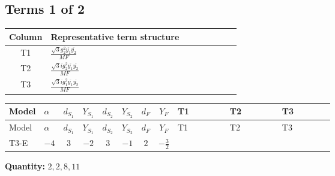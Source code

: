 \documentclass[8pt]{article}
\begin{document}
\begin{landscape}
\subsection*{Terms 1 of 2}
\begin{center}
\begin{tabular}{@{}c >{\raggedright\arraybackslash}p{0.82\linewidth}@{}}
\toprule
Column & Representative term structure \\
\midrule
T1 & \(\displaystyle \frac{\sqrt{3} g_{2}^{2} \overline{y_{1}} \overline{y_{2}}}{MF}\) \\
\midrule
T2 & \(\displaystyle \frac{\sqrt{3} i g_{2}^{2} \overline{y_{1}} \overline{y_{2}}}{MF}\) \\
\midrule
T3 & \(\displaystyle \frac{\sqrt{3} i g_{1}^{2} \overline{y_{1}} \overline{y_{2}}}{MF}\) \\
\midrule
\bottomrule
\end{tabular}
\end{center}
\smallskip
\tiny
\begin{longtable}{@{}llcccccc >{\raggedright\arraybackslash}p{0.21\linewidth} >{\raggedright\arraybackslash}p{0.21\linewidth} >{\raggedright\arraybackslash}p{0.21\linewidth}@{}}
\toprule
Model & $\alpha$ & $d_{S_1}$ & $Y_{S_1}$ & $d_{S_2}$ & $Y_{S_2}$ & $d_F$ & $Y_F$ & T1 & T2 & T3 \\
\midrule
\endfirsthead
\toprule
Model & $\alpha$ & $d_{S_1}$ & $Y_{S_1}$ & $d_{S_2}$ & $Y_{S_2}$ & $d_F$ & $Y_F$ & T1 & T2 & T3 \\
\midrule
\endhead
T3-E & $-4$ & $3$ & $-2$ & $3$ & $-1$ & $2$ & $-\frac{3}{2}$ & \scriptsize\adjustbox{max width=\linewidth}{$\begin{gathered} - \frac{\sqrt{3} g_{2}^{2} \overline{y_{1}} \overline{y_{2}}}{6 MF}\end{gathered}$} & \scriptsize\adjustbox{max width=\linewidth}{$\begin{gathered} - \frac{11 \sqrt{3} i g_{2}^{2} \overline{y_{1}} \overline{y_{2}}}{8 MF}\end{gathered}$} & \scriptsize\adjustbox{max width=\linewidth}{$\begin{gathered} - \frac{9 \sqrt{3} i g_{1}^{2} \overline{y_{1}} \overline{y_{2}}}{8 MF}\end{gathered}$} \\
\midrule
\bottomrule
\end{longtable}
\clearpage
\noindent\textbf{Quantity: }$\mathrm{2,2,8,11}$\par\smallskip

\end{landscape}
\end{document}

